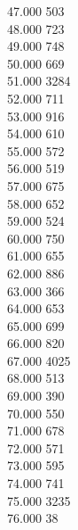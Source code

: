 { 47.000	503 \\
 48.000	723 \\
 49.000	748 \\
 50.000	669 \\
 51.000	3284 \\
 52.000	711 \\
 53.000	916 \\
 54.000	610 \\
 55.000	572 \\
 56.000	519 \\
 57.000	675 \\
 58.000	652 \\
 59.000	524 \\
 60.000	750 \\
 61.000	655 \\
 62.000	886 \\
 63.000	366 \\
 64.000	653 \\
 65.000	699 \\
 66.000	820 \\
 67.000	4025 \\
 68.000	513 \\
 69.000	390 \\
 70.000	550 \\
 71.000	678 \\
 72.000	571 \\
 73.000	595 \\
 74.000	741 \\
 75.000	3235 \\
 76.000	38 \\
}
